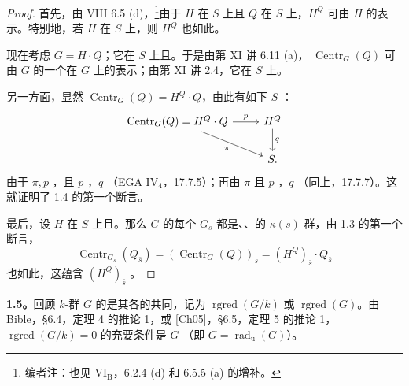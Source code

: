 \begin{proof}
首先，由 VIII 6.5 (d)，\footnote[6]{编者注：也见 VI$_{\mathrm B}$，6.2.4 (d) 和 6.5.5 (a) 的增补。}由于 $H$ 在 $S$ 上且 $Q$ 在 $S$ 上，$H^Q$ 可由 $H$ 的表示。特别地，若 $H$ 在 $S$ 上，则 $H^Q$ 也如此。

现在考虑 $G=H\cdot Q$；它在 $S$ 上且。于是由第 XI 讲 6.11 (a)，\footnotemark[6] $\operatorname{Centr}_G(Q)$ 可由 $G$ 的一个在 $G$ 上的表示；由第 XI 讲 2.4，它在 $S$ 上。

另一方面，显然 $\operatorname{Centr}_G(Q)=H^Q\cdot Q$，由此有如下 $S$-：
\[
\begin{tikzcd}
\operatorname{Centr}_G(Q)=H^Q\cdot Q\arrow[r,"p"]\arrow[dr,"\pi"']&H^Q\arrow[d,"q"]\\
&S.
\end{tikzcd}
\]
由于 $\pi,p$ ，且 $p$ ，$q$ （EGA IV$_4$，17.7.5）；再由 $\pi$ 且 $p$ ，$q$ （同上，17.7.7）。这就证明了 1.4 的第一个断言。

最后，设 $H$ 在 $S$ 上且。那么 $G$ 的每个 $G_{\bar s}$ 都是、、的 $\kappa(\bar s)$-群，由 1.3 的第一个断言，
\[
\operatorname{Centr}_{G_{\bar s}}(Q_{\bar s})=(\operatorname{Centr}_G(Q))_{\bar s}=(H^Q)_{\bar s}\cdot Q_{\bar s}
\]
也如此，这蕴含 $(H^Q)_{\bar s}$ 。
\end{proof}
\textbf{1.5。}回顾 $k$-群 $G$ 的是其各的共同，记为 $\operatorname{rgred}(G/k)$ 或 $\operatorname{rgred}(G)$。由 Bible，\S 6.4，定理 4 的推论 1，或 [Ch05]，\S 6.5，定理 5 的推论 1，$\operatorname{rgred}(G/k)=0$ 的充要条件是 $G$ （即 $G=\operatorname{rad}_{\mathrm u}(G)$）。

